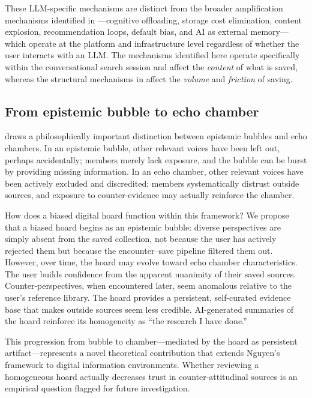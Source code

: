 \documentclass[12pt,a4paper]{article}
\begin{document}
These LLM-specific mechanisms are distinct from the broader amplification mechanisms identified in \citet{Author2026b}---cognitive offloading, storage cost elimination, content explosion, recommendation loops, default bias, and AI as external memory---which operate at the platform and infrastructure level regardless of whether the user interacts with an LLM.
The mechanisms identified here operate specifically within the conversational search session and affect the \emph{content} of what is saved, whereas the structural mechanisms in \citet{Author2026b} affect the \emph{volume} and \emph{friction} of saving.


\subsection{From epistemic bubble to echo chamber}

\citet{Nguyen2020} draws a philosophically important distinction between epistemic bubbles and echo chambers.
In an epistemic bubble, other relevant voices have been left out, perhaps accidentally; members merely lack exposure, and the bubble can be burst by providing missing information.
In an echo chamber, other relevant voices have been actively excluded and discredited; members systematically distrust outside sources, and exposure to counter-evidence may actually reinforce the chamber.

How does a biased digital hoard function within this framework?
We propose that a biased hoard begins as an epistemic bubble: diverse perspectives are simply absent from the saved collection, not because the user has actively rejected them but because the encounter--save pipeline filtered them out.
However, over time, the hoard may evolve toward echo chamber characteristics.
The user builds confidence from the apparent unanimity of their saved sources.
Counter-perspectives, when encountered later, seem anomalous relative to the user's reference library.
The hoard provides a persistent, self-curated evidence base that makes outside sources seem less credible.
AI-generated summaries of the hoard reinforce its homogeneity as ``the research I have done.''

This progression from bubble to chamber---mediated by the hoard as persistent artifact---represents a novel theoretical contribution that extends Nguyen's framework to digital information environments.
Whether reviewing a homogeneous hoard actually decreases trust in counter-attitudinal sources is an empirical question flagged for future investigation.
\end{document}
